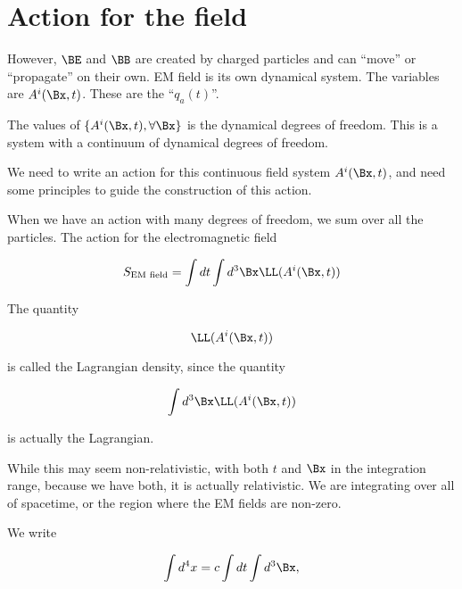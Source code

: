 %
%
\section{Action for the field}

However, $\BE$ and $\BB$ are created by charged particles and can ``move'' or ``propagate'' on their own.  EM field is its own dynamical system.  The variables are $A^i(\Bx, t)$.  These are the ``$q_a(t)$''.

The values of $\{A^i(\Bx, t), \forall \Bx\}$ is the dynamical degrees of freedom.  This is a system with a continuum of dynamical degrees of freedom.

We need to write an action for this continuous field system $A^i(\Bx,t)$, and need some principles to guide the construction of this action.

When we have an action with many degrees of freedom, we sum over all the particles.  The action for the electromagnetic field 

\begin{equation}\label{eqn:relativisticElectrodynamicsL12:90}
S_{\text{EM field}} = \int dt \int d^3\Bx \LL(A^i(\Bx, t))
\end{equation}

The quantity 

\begin{equation}\label{eqn:relativisticElectrodynamicsL12:110}
\LL(A^i(\Bx, t))
\end{equation}

is called the Lagrangian density, since the quantity

\begin{equation}\label{eqn:relativisticElectrodynamicsL12:130}
\int d^3\Bx \LL(A^i(\Bx, t))
\end{equation}

is actually the Lagrangian.

While this may seem non-relativistic, with both $t$ and $\Bx$ in the integration range, because we have both, it is actually relativistic.  We are integrating over all of spacetime, or the region where the EM fields are non-zero.

We write

\begin{equation}\label{eqn:relativisticElectrodynamicsL12:150}
\int d^4 x  = c \int dt \int d^3 \Bx,
\end{equation}

